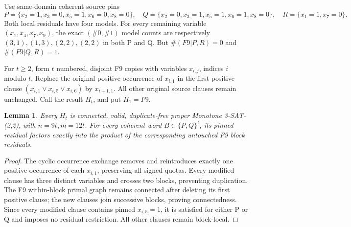 \documentclass[11pt]{article}
\newtheorem{lemma}{Lemma}
\begin{document}
Use same-domain coherent source pins
\[
P=\{x_2=1,x_3=0,x_5=1,x_6=0,x_8=0\},\quad
Q=\{x_2=0,x_3=1,x_5=1,x_6=1,x_8=0\},
\quad R=\{x_1=1,x_7=0\}.
\]
Both local residuals have four models. For every remaining variable $(x_1,x_4,x_7,x_9)$, the exact $(\#0,\#1)$ model counts are respectively $(3,1),(1,3),(2,2),(2,2)$ in both P and Q. But $\#(F9|P,R)=0$ and $\#(F9|Q,R)=1$.

For $t\ge2$, form $t$ numbered, disjoint F9 copies with variables $x_{i,j}$, indices $i$ modulo $t$. Replace the original positive occurrence of $x_{i,1}$ in the first positive clause $(x_{i,1}\lor x_{i,5}\lor x_{i,6})$ by $x_{i+1,1}$. All other original source clauses remain unchanged. Call the result $H_t$, and put $H_1=F9$.

\begin{lemma}
Every $H_t$ is connected, valid, duplicate-free proper Monotone 3-SAT-(2,2), with $n=9t,m=12t$. For every coherent word $B\in\{P,Q\}^t$, its pinned residual factors exactly into the product of the corresponding untouched F9 block residuals.
\end{lemma}
\begin{proof}
The cyclic occurrence exchange removes and reintroduces exactly one positive occurrence of each $x_{i,1}$, preserving all signed quotas. Every modified clause has three distinct variables and crosses two blocks, preventing duplication. The F9 within-block primal graph remains connected after deleting its first positive clause; the new clauses join successive blocks, proving connectedness. Since every modified clause contains pinned $x_{i,5}=1$, it is satisfied for either P or Q and imposes no residual restriction. All other clauses remain block-local.
\end{proof}
\end{document}

